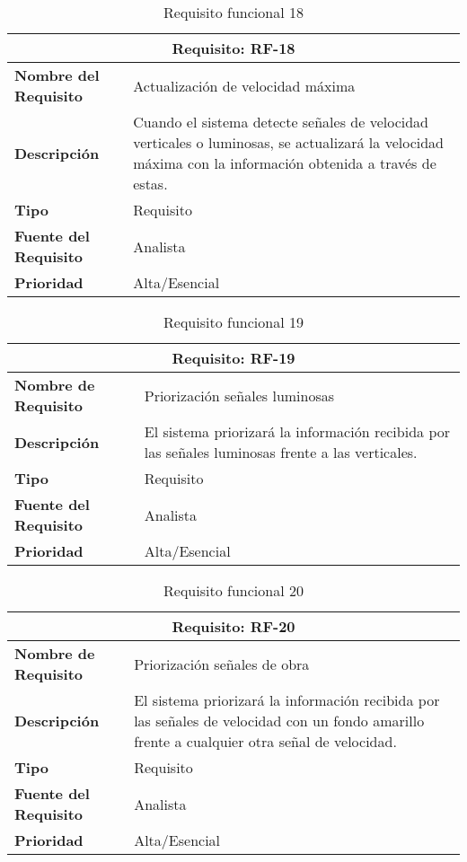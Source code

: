\begin{table}[H]
\begin{center}
\begin{tabular}{p{} p{7cm}}
\multicolumn{2}{c}{\textbf{Requisito: RF-18} } \\
\hline \hline
\textbf{Nombre del Requisito} & Actualización de velocidad máxima \\
\hline
\textbf{Descripción} & Cuando el sistema detecte señales de velocidad verticales o luminosas, se actualizará la velocidad máxima con la información obtenida a través de estas. \\
\hline
\textbf{Tipo} & Requisito \\
\hline
\textbf{Fuente del Requisito} & Analista \\
\hline
\textbf{Prioridad} & Alta/Esencial \\ \hline
\end{tabular}
\caption{Requisito funcional 18}
\label{tab:RF-18}
\end{center}
\end{table}

\begin{table}[H]
\begin{center}
\begin{tabular}{p{} p{7cm}}
\multicolumn{2}{c}{\textbf{Requisito: RF-19} } \\
\hline \hline
\textbf{Nombre de Requisito} & Priorización señales luminosas \\
\hline
\textbf{Descripción} & El sistema priorizará la información recibida por las señales luminosas frente a las verticales. \\
\hline
\textbf{Tipo} & Requisito \\
\hline
\textbf{Fuente del Requisito} & Analista \\
\hline
\textbf{Prioridad} & Alta/Esencial \\ \hline
\end{tabular}
\caption{Requisito funcional 19}
\label{tab:RF-19}
\end{center}
\end{table}

\begin{table}[H]
\begin{center}
\begin{tabular}{p{} p{7cm}}
\multicolumn{2}{c}{\textbf{Requisito: RF-20} } \\
\hline \hline
\textbf{Nombre de Requisito} & Priorización señales de obra\\
\hline
\textbf{Descripción} & El sistema priorizará la información recibida por las señales de velocidad con un fondo amarillo frente a cualquier otra señal de velocidad. \\
\hline
\textbf{Tipo} & Requisito \\
\hline
\textbf{Fuente del Requisito} & Analista \\
\hline
\textbf{Prioridad} & Alta/Esencial \\ \hline
\end{tabular}
\caption{Requisito funcional 20}
\label{tab:RF-20}
\end{center}
\end{table}

